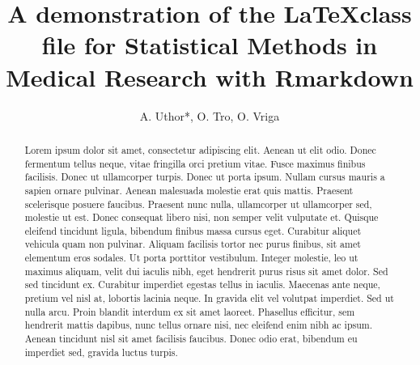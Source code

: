 \documentclass[Royal,times,sageh]{sagej}
\begin{document}

\title{A demonstration of the \LaTeX class file for Statistical Methods
in Medical Research with Rmarkdown}


\author{A. Uthor*, O. Tro, O.
Vriga}




\begin{abstract}
Lorem ipsum dolor sit amet, consectetur adipiscing elit. Aenean ut elit
odio. Donec fermentum tellus neque, vitae fringilla orci pretium vitae.
Fusce maximus finibus facilisis. Donec ut ullamcorper turpis. Donec ut
porta ipsum. Nullam cursus mauris a sapien ornare pulvinar. Aenean
malesuada molestie erat quis mattis. Praesent scelerisque posuere
faucibus. Praesent nunc nulla, ullamcorper ut ullamcorper sed, molestie
ut est. Donec consequat libero nisi, non semper velit vulputate et.
Quisque eleifend tincidunt ligula, bibendum finibus massa cursus eget.
Curabitur aliquet vehicula quam non pulvinar. Aliquam facilisis tortor
nec purus finibus, sit amet elementum eros sodales. Ut porta porttitor
vestibulum. Integer molestie, leo ut maximus aliquam, velit dui iaculis
nibh, eget hendrerit purus risus sit amet dolor. Sed sed tincidunt ex.
Curabitur imperdiet egestas tellus in iaculis. Maecenas ante neque,
pretium vel nisl at, lobortis lacinia neque. In gravida elit vel
volutpat imperdiet. Sed ut nulla arcu. Proin blandit interdum ex sit
amet laoreet. Phasellus efficitur, sem hendrerit mattis dapibus, nunc
tellus ornare nisi, nec eleifend enim nibh ac ipsum. Aenean tincidunt
nisl sit amet facilisis faucibus. Donec odio erat, bibendum eu imperdiet
sed, gravida luctus turpis.
\end{abstract}


\maketitle
\end{document}

